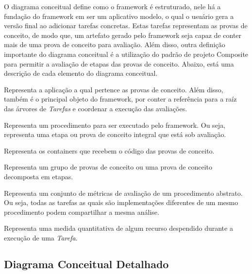 \documentclass[12pt]{tcc}
\begin{document}
O diagrama conceitual define como o framework é estruturado, nele há a fundação do framework em ser um aplicativo modelo, o qual o usuário gera a versão final ao adicionar tarefas concretas.
Estas tarefas representam as provas de conceito, de modo que, um artefato gerado pelo framework seja capaz de conter mais de uma prova de conceito para avaliação.
Além disso, outra definição importante do diagrama conceitual é a utilização do padrão de projeto Composite \citep{Gamma1995Design} para permitir a avaliação de etapas das provas de conceito.
Abaixo, está uma descrição de cada elemento do diagrama conceitual.

\begin{description}
	\label{descrip:diagrama-conceitual}

	\item[Projeto:] Representa a aplicação a qual pertence as provas de conceito. Além disso, também é o principal objeto do framework, por conter a referência para a raíz das árvores de \textit{Tarefas} e coordenar a execução das avaliações.
	
	\item[Tarefa Abstrata:] Representa um procedimento para ser executado pelo framework. Ou seja, representa uma etapa ou prova de conceito integral que está sob avaliação.

	\item[Tarefa Simples:] Representa os containers que recebem o código das provas de conceito.

	\item[Tarefa Composta:] Representa um grupo de provas de conceito ou uma prova de conceito decomposta em etapas.

	\item[Análise:] Representa um conjunto de métricas de avaliação de um procedimento abstrato. Ou seja, todas as tarefas as quais são implementações diferentes de um mesmo procedimento podem compartilhar a mesma análise.

	\item[Métrica:] Representa uma medida quantitativa de algum recurso despendido durante a execução de uma \textit{Tarefa}.

\end{description}


\subsection{Diagrama Conceitual Detalhado}
\end{document}
